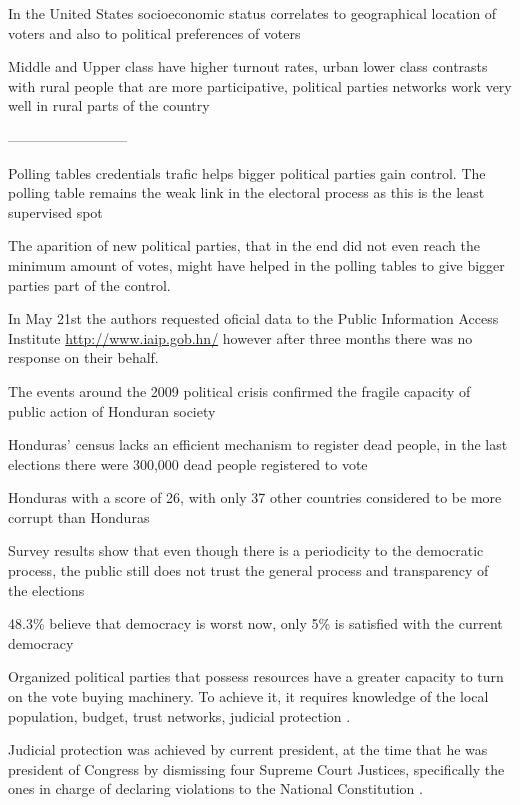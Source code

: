 \documentclass[a4paper,10pt]{article}
\begin{document}
In the United States socioeconomic status correlates to geographical location of voters and also to political preferences of voters \citep{osborn2010}

Middle and Upper class have higher turnout rates, urban lower class contrasts with rural people that are more participative, political parties networks work very well in rural parts of the country \citep{romero2014}

--------------------------

Polling tables credentials trafic helps bigger political parties gain control. The polling table remains the weak link in the electoral process as this is the least supervised spot \citep{romero2014}

The aparition of new political parties, that in the end did not even reach the minimum amount of votes, might have helped in the polling tables to give bigger parties part of the control.

In May 21st the authors requested oficial data to the Public Information Access Institute \url{http://www.iaip.gob.hn/} however after three months there was no response on their behalf.

The events around the 2009 political crisis confirmed the fragile capacity of public action of Honduran society \citep{romero2014}

Honduras' census lacks an efficient mechanism to register dead people, in the last elections there were 300,000 dead people registered to vote \citep{romero2014}

Honduras with a score of 26, with only 37 other countries considered to be more corrupt than Honduras \citep{transp}

Survey results show that even though there is a periodicity to the democratic process, the public still does not trust the general process and transparency of the elections \citep{romero2014}

48.3\% believe that democracy is worst now, only 5\% is satisfied with the current democracy \citep{latinbar}

Organized political parties that possess resources have a greater capacity to turn on the vote buying machinery. To achieve it, it requires knowledge of the local population, budget, trust networks, judicial protection \citep{gonza2014}.

Judicial protection was achieved by current president, at the time that he was president of Congress by dismissing four Supreme Court Justices, specifically the ones in charge of declaring violations to the National Constitution \citep{csj2012}.
\end{document}
